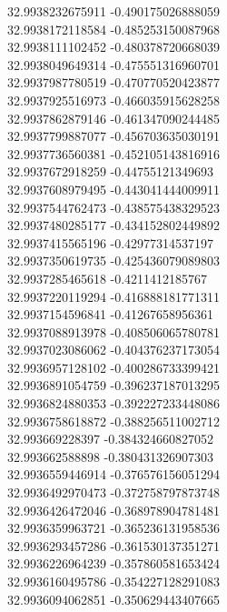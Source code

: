 {32.9938232675911	-0.490175026888059\\
32.9938172118584	-0.485253150087968\\
32.9938111102452	-0.480378720668039\\
32.9938049649314	-0.475551316960701\\
32.9937987780519	-0.470770520423877\\
32.9937925516973	-0.466035915628258\\
32.9937862879146	-0.461347090244485\\
32.9937799887077	-0.456703635030191\\
32.9937736560381	-0.452105143816916\\
32.9937672918259	-0.44755121349693\\
32.9937608979495	-0.443041444009911\\
32.9937544762473	-0.438575438329523\\
32.9937480285177	-0.434152802449892\\
32.9937415565196	-0.42977314537197\\
32.9937350619735	-0.425436079089803\\
32.9937285465618	-0.4211412185767\\
32.9937220119294	-0.416888181771311\\
32.9937154596841	-0.41267658956361\\
32.9937088913978	-0.408506065780781\\
32.9937023086062	-0.404376237173054\\
32.9936957128102	-0.400286733399421\\
32.9936891054759	-0.396237187013295\\
32.9936824880353	-0.392227233448086\\
32.9936758618872	-0.388256511002712\\
32.993669228397	-0.384324660827052\\
32.993662588898	-0.380431326907303\\
32.9936559446914	-0.376576156051294\\
32.9936492970473	-0.372758797873748\\
32.9936426472046	-0.368978904781481\\
32.9936359963721	-0.365236131958536\\
32.9936293457286	-0.361530137351271\\
32.9936226964239	-0.357860581653424\\
32.9936160495786	-0.354227128291083\\
32.9936094062851	-0.350629443407665\\
}
